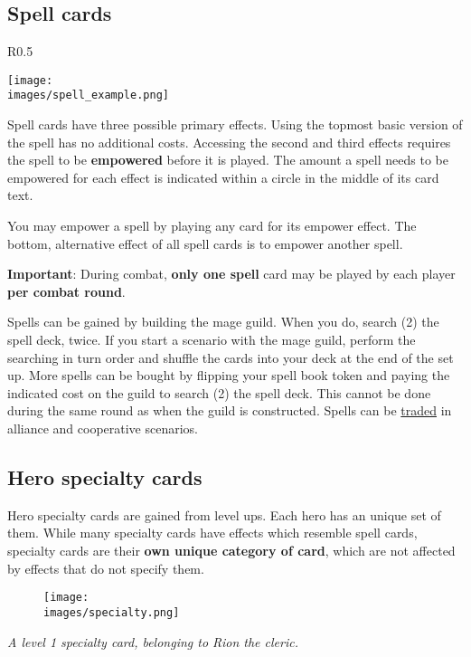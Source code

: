 \documentclass[12pt]{article}
\def\assets{assets}
\def\images{\assets/images}
\def\svgs{\assets/svgs}
\begin{document}
\clearpage

\subsection*{\hypertarget{spells}{Spell cards}}
\begin{wrapfigure}{R}{0.5\textwidth}
    \begin{center}
    \texttt{[image: \\images/spell\_example.png]}
    \end{center}
\end{wrapfigure}

Spell cards have three possible primary effects. Using the topmost basic version of the spell has no additional costs. Accessing the second and third effects requires the spell to be \textbf{empowered} before it is played. The amount a spell needs to be empowered for each effect is indicated within a circle in the middle of its card text.\par
You may empower a spell by playing any card for its empower  effect. The bottom, alternative effect of all spell cards is to empower another spell.\par
\textbf{Important}: During combat, \textbf{only one spell} card may be played by each player \textbf{per combat round}.\par
Spells can be gained by building the mage guild. When you do, search (2) the spell deck, twice. If you start a scenario with the mage guild, perform the searching in turn order and shuffle the cards into your deck at the end of the set up. More spells can be bought by flipping your spell book token and paying the indicated cost on the guild to search (2) the spell deck. This cannot be done during the same round as when the guild is constructed. Spells can be \hyperlink{Trading}{traded} in alliance and cooperative scenarios.

\subsection*{\hypertarget{Specialty}{Hero specialty cards}}
Hero specialty cards are gained from level ups. Each hero has an unique set of them. While many specialty cards have effects which resemble spell cards, specialty cards are their \textbf{own unique category of card}, which are not affected by effects that do not specify them.
\par

\begin{figure}[h]
\centering
\texttt{[image: \\images/specialty.png]}
\end{figure}
\begin{center}
\textit{A level 1 specialty card, belonging to Rion the cleric.}
\end{center}
\end{document}

